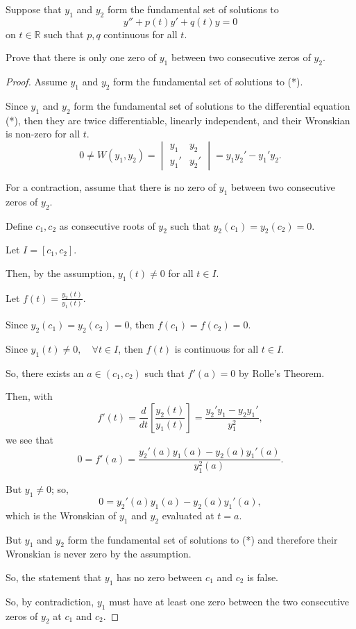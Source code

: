 \documentclass[../hw6]{subfiles}
\begin{document}
Suppose that $y_1$ and $y_2$ form the fundamental set of solutions to
\[y''+p(t)y'+q(t)y=0 \tag{*}\] on $t\in\mathbb{R}$ such that $p,q$ continuous for all $t$.

Prove that there is only one zero of $y_1$ between two consecutive zeros of $y_2$.

\begin{proof}
Assume $y_1$ and $y_2$ form the fundamental set of solutions to (*).

Since $y_1$ and $y_2$ form the fundamental set of solutions to the differential equation (*), then they are twice differentiable, linearly independent, and their Wronskian is non-zero for all $t$.
\[0 \neq W(y_1, y_2) = \begin{vmatrix}
    y_1 & y_2 \\
    y_1' & y_2'
\end{vmatrix}
= y_1 y_2' - y_1'y_2.\]

For a contraction, assume that there is no zero of $y_1$ between two consecutive zeros of $y_2$. 

Define $c_1,c_2$ as consecutive roots of $y_2$ such that $y_2(c_1)=y_2(c_2)=0$.

Let $I=[c_1,c_2]$.

Then, by the assumption, $y_1(t)\neq 0$ for all $t\in I$.

Let $f(t)=\frac{y_2(t)}{y_1(t)}$.

Since $y_2(c_1)=y_2(c_2)=0$, then $f(c_1)=f(c_2)=0$.

Since $y_1(t)\neq0, \quad \forall t \in I$, then $f(t)$ is continuous for all $t\in I$.

So, there exists an $a\in(c_1,c_2)$ such that $f'(a)=0$ by Rolle's Theorem.

Then, with
\[f'(t)=\frac{d}{dt}\left[ \frac{y_2(t)}{y_1(t)} \right]=\frac{y_2'y_1-y_2y_1'}{y_1^2},\]
we see that
\[0=f'(a)=\frac{y_2'(a)y_1(a)-y_2(a)y_1'(a)}{y_1^2(a)}.\]

But $y_1\neq0$; so, \[0=y_2'(a)y_1(a)-y_2(a)y_1'(a),\] which is the Wronskian of $y_1$ and $y_2$ evaluated at $t=a$. 

But $y_1$ and $y_2$ form the fundamental set of solutions to (*) and therefore their Wronskian is never zero by the assumption. 

So, the statement that $y_1$ has no zero between $c_1$ and $c_2$ is false. 

So, by contradiction, $y_1$ must have at least one zero between the two consecutive zeros of $y_2$ at $c_1$ and $c_2$.


\end{proof}
\end{document}
